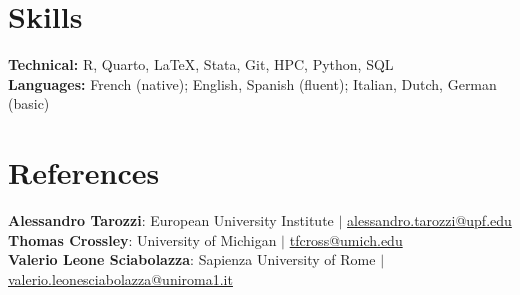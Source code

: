 \documentclass[10pt, a4paper]{article}
\begin{document}

\section{Skills}
 \begin{itemize}[leftmargin=0.5cm, label={}]
    \small{\item{
         \textbf{Technical:}{ R, Quarto, \LaTeX{}, Stata, Git, HPC, Python, SQL} \\
     \textbf{Languages:}{ French (native); English, Spanish (fluent); Italian, Dutch, German (basic)} 
    }}
 \end{itemize}
    

\section{References}
 \begin{itemize}[leftmargin=0.5cm, label={}]
    \small{\item{
     \textbf{Alessandro Tarozzi}{: European University Institute  $|$ \href{mailto:alessandro.tarozzi@upf.edu}{alessandro.tarozzi@upf.edu}} \\
     \textbf{Thomas Crossley}{:  University of Michigan $|$ \href{mailto:tfcross@umich.edu}{tfcross@umich.edu}}  \\
     \textbf{Valerio Leone Sciabolazza}{:  Sapienza University of Rome $|$ \href{mailto:valerio.leonesciabolazza@uniroma1.it}{valerio.leonesciabolazza@uniroma1.it}} 
    }} \\
    
 \end{itemize} 
    
  
\end{document}
